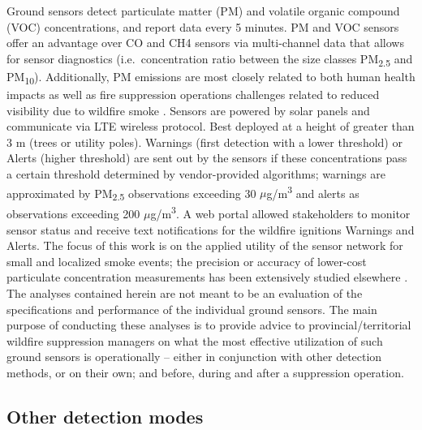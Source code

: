 \documentclass[fire,article,submit,moreauthors]{mdpi}
\begin{document}
Ground sensors detect particulate matter (PM) and volatile organic
compound (VOC) concentrations, and report data every 5 minutes. PM and
VOC sensors offer an advantage over CO and CH4 sensors via multi-channel
data that allows for sensor diagnostics (i.e.~concentration ratio
between the size classes PM\textsubscript{2.5} and
PM\textsubscript{10}). Additionally, PM emissions are most closely
related to both human health impacts \citep{matz2026} as well as fire
suppression operations challenges related to reduced visibility due to
wildfire smoke \citep{brambilla2025}. Sensors are powered by solar
panels and communicate via LTE wireless protocol. Best deployed at a
height of greater than 3 m (trees or utility poles). Warnings (first
detection with a lower threshold) or Alerts (higher threshold) are sent
out by the sensors if these concentrations pass a certain threshold
determined by vendor-provided algorithms; warnings are approximated by
PM\textsubscript{2.5} observations exceeding 30
\(\mu\)g/m\textsuperscript{3} and alerts as observations exceeding 200
\(\mu\)g/m\textsuperscript{3}. A web portal allowed stakeholders to
monitor sensor status and receive text notifications for the wildfire
ignitions Warnings and Alerts. The focus of this work is on the applied
utility of the sensor network for small and localized smoke events; the
precision or accuracy of lower-cost particulate concentration
measurements has been extensively studied elsewhere \citep{holder2020}.
The analyses contained herein are not meant to be an evaluation of the
specifications and performance of the individual ground sensors. The
main purpose of conducting these analyses is to provide advice to
provincial/territorial wildfire suppression managers on what the most
effective utilization of such ground sensors is operationally -- either
in conjunction with other detection methods, or on their own; and
before, during and after a suppression operation.

\subsection{Other detection modes}\label{other-detection-modes}
\end{document}
